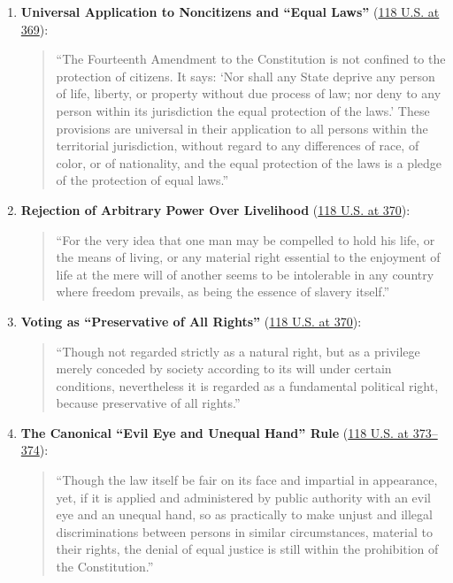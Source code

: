 \documentclass[12pt]{article}
\begin{document}
\begin{enumerate}
    \item \textbf{Universal Application to Noncitizens and ``Equal Laws''} (\href{https://supreme.justia.com/cases/federal/us/118/356/}{118 U.S. at 369}):
    \begin{quote}
        ``The Fourteenth Amendment to the Constitution is not confined to the protection of citizens. It says: `Nor shall any State deprive any person of life, liberty, or property without due process of law; nor deny to any person within its jurisdiction the equal protection of the laws.' These provisions are universal in their application to all persons within the territorial jurisdiction, without regard to any differences of race, of color, or of nationality, and the equal protection of the laws is a pledge of the protection of equal laws.''
    \end{quote}

    \item \textbf{Rejection of Arbitrary Power Over Livelihood} (\href{https://supreme.justia.com/cases/federal/us/118/356/}{118 U.S. at 370}):
    \begin{quote}
        ``For the very idea that one man may be compelled to hold his life, or the means of living, or any material right essential to the enjoyment of life at the mere will of another seems to be intolerable in any country where freedom prevails, as being the essence of slavery itself.''
    \end{quote}

    \item \textbf{Voting as ``Preservative of All Rights''} (\href{https://supreme.justia.com/cases/federal/us/118/356/}{118 U.S. at 370}):
    \begin{quote}
        ``Though not regarded strictly as a natural right, but as a privilege merely conceded by society according to its will under certain conditions, nevertheless it is regarded as a fundamental political right, because preservative of all rights.''
    \end{quote}

    \item \textbf{The Canonical ``Evil Eye and Unequal Hand'' Rule} (\href{https://supreme.justia.com/cases/federal/us/118/356/}{118 U.S. at 373--374}):
    \begin{quote}
        ``Though the law itself be fair on its face and impartial in appearance, yet, if it is applied and administered by public authority with an evil eye and an unequal hand, so as practically to make unjust and illegal discriminations between persons in similar circumstances, material to their rights, the denial of equal justice is still within the prohibition of the Constitution.''
    \end{quote}


\end{enumerate}
\end{document}
